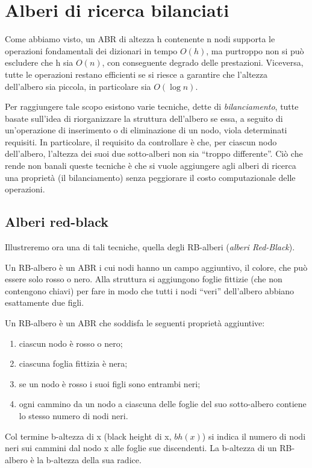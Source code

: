 \section{Alberi di ricerca bilanciati}
Come abbiamo visto, un ABR di altezza h contenente n nodi supporta le operazioni fondamentali dei dizionari in tempo $O(h)$, ma purtroppo non si può escludere che h sia $O(n)$, con conseguente degrado delle prestazioni. Viceversa, tutte le operazioni restano efficienti se si riesce a garantire che l’altezza dell'albero sia piccola, in particolare sia $O(\log n)$.

Per raggiungere tale scopo esistono varie tecniche, dette di \textit{bilanciamento}, tutte basate sull'idea di riorganizzare la struttura dell'albero se essa, a seguito di un'operazione di inserimento o di eliminazione di un nodo, viola determinati requisiti. In particolare, il requisito da controllare è che, per ciascun nodo dell'albero, l’altezza dei suoi due sotto-alberi non sia “troppo differente”. Ciò che rende non banali queste tecniche è che si vuole aggiungere agli alberi di ricerca una proprietà (il bilanciamento) senza peggiorare il costo computazionale delle operazioni.

\subsection*{Alberi red-black}
Illustreremo ora una di tali tecniche, quella degli RB-alberi (\textit{alberi Red-Black}).

Un RB-albero è un ABR i cui nodi hanno un campo aggiuntivo, il colore, che può essere solo rosso o nero. Alla struttura si aggiungono foglie fittizie (che non contengono chiavi) per fare in modo che tutti i nodi “veri” dell'albero abbiano esattamente due figli.

Un RB-albero è un ABR che soddisfa le seguenti proprietà aggiuntive:
\begin{enumerate}
    \item ciascun nodo è rosso o nero;
    \item ciascuna foglia fittizia è nera;
    \item se un nodo è rosso i suoi figli sono entrambi neri;
    \item ogni cammino da un nodo a ciascuna delle foglie del suo sotto-albero contiene lo stesso numero di nodi neri.
\end{enumerate}

Col termine b-altezza di x (black height di x, $bh(x)$) si indica il numero di nodi neri sui cammini dal nodo x alle foglie sue discendenti. La b-altezza di un RB-albero è la b-altezza della sua radice.


